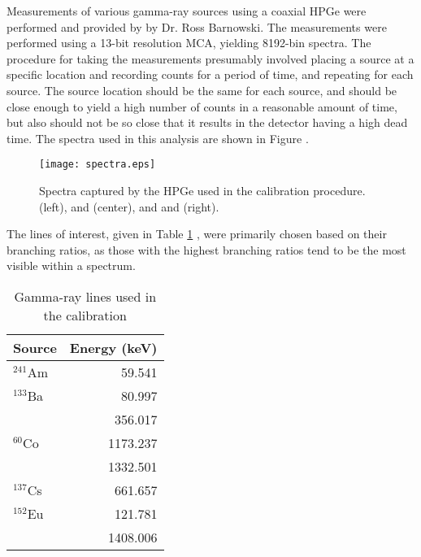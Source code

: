 Measurements of various gamma-ray sources using a coaxial HPGe were performed and provided by
by Dr. Ross Barnowski. The measurements were performed using a 13-bit resolution MCA,
yielding 8192-bin spectra. The procedure for taking the measurements presumably involved placing a
source at a specific location and recording counts for a period of time, and
repeating for each source. The source location should be the same for each source,
and should be close enough to yield a high number of counts in a reasonable amount of
time, but also should not be so close that it results in the detector having a
high dead time. The spectra used in this analysis are shown in Figure \label{fig:spectra}.

\begin{figure}[H]
\label{fig:spectra}
\begin{center}
\texttt{[image: spectra.eps]}
\caption{Spectra captured by the HPGe used in the calibration procedure.  (left),  and  (center), and  and  (right).}
\end{center}
\end{figure}

The lines of interest, given in Table
\ref{tab:src} \cite{lund}, were primarily chosen based on their
branching ratios, as those with the highest branching ratios tend to be
the most visible within a spectrum.

\begin{table}[H]
  \begin{center}
    \begin{tabular}{l|r}
      \textbf{Source} & \textbf{Energy (keV)}\\
      \hline
      $^{241}$Am    &  59.541    \\
      $^{133}$Ba    &  80.997    \\
                    &  356.017   \\
      $^{60}$Co     &  1173.237  \\
                    &  1332.501  \\
      $^{137}$Cs    &  661.657   \\
      $^{152}$Eu    &  121.781   \\
                    &  1408.006  \\
    \end{tabular}
    \caption{Gamma-ray lines used in the calibration}
    \label{tab:src}
  \end{center}
\end{table}

